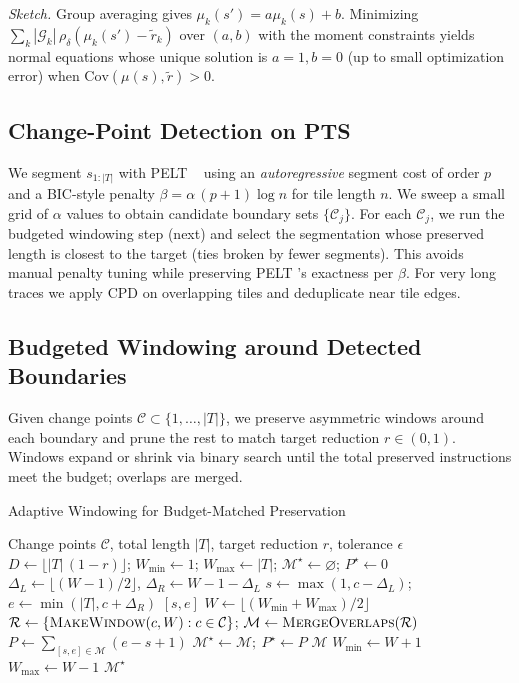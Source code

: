 \documentclass[conference]{IEEEtran}
\newcommand{\pts}{\textsc{PTS} }
\newcommand{\pelt}{\textsc{PELT} }
\begin{document}
\noindent\emph{Sketch.}
Group averaging gives \(\mu_k(s')=a\mu_k(s)+b\). Minimizing \(\sum_k|\mathcal{G}_k|\,\rho_\delta(\mu_k(s')-\tilde{r}_k)\) over \((a,b)\) with the moment constraints yields normal equations whose unique solution is \(a{=}1,b{=}0\) (up to small optimization error) when \(\mathrm{Cov}(\mu(s),\tilde{r})>0\).

\subsection{Change-Point Detection on \pts}
\label{subsec:cpd}
We segment \(s_{1:|T|}\) with \pelt~\cite{pelt12} using an \emph{autoregressive} segment cost of order \(p\) and a BIC-style penalty \(\beta=\alpha\,(p{+}1)\log n\) for tile length \(n\). We sweep a small grid of \(\alpha\) values to obtain candidate boundary sets \(\{\mathcal{C}_j\}\). For each \(\mathcal{C}_j\), we run the budgeted windowing step (next) and select the segmentation whose preserved length is closest to the target (ties broken by fewer segments). This avoids manual penalty tuning while preserving \pelt’s exactness per \(\beta\). For very long traces we apply CPD on overlapping tiles and deduplicate near tile edges.

\subsection{Budgeted Windowing around Detected Boundaries}
Given change points \(\mathcal{C}\subset\{1,\ldots,|T|\}\), we preserve asymmetric windows around each boundary and prune the rest to match target reduction \(r\in(0,1)\). Windows expand or shrink via binary search until the total preserved instructions meet the budget; overlaps are merged.

\begin{algorithm}[t]
\caption{Adaptive Windowing for Budget-Matched Preservation}
\label{alg:adaptive}
\small
\begin{algorithmic}[1]
\Require Change points \(\mathcal{C}\), total length \(|T|\), target reduction \(r\), tolerance \(\epsilon\)
\State \(D\gets \lfloor |T|\,(1-r)\rfloor\); \(W_{\min}\gets 1\); \(W_{\max}\gets |T|\); \(\mathcal{M}^\star\gets\varnothing\); \(P^\star\gets 0\)
  \State \(\Delta_L\gets\lfloor(W-1)/2\rfloor\), \(\Delta_R\gets W-1-\Delta_L\)
  \State \(s\gets\max(1,c-\Delta_L)\); \(e\gets\min(|T|,c+\Delta_R)\)
  \State \Return \([s,e]\)
\EndFunction
{}
  \State \(W\gets\lfloor(W_{\min}+W_{\max})/2\rfloor\)
  \State \(\mathcal{R}\gets \{\textsc{MakeWindow}(c,W):c\in\mathcal{C}\}\); \(\mathcal{M}\gets \textsc{MergeOverlaps}(\mathcal{R})\)
  \State \(P\gets\sum_{[s,e]\in\mathcal{M}}(e-s+1)\)
   \(\mathcal{M}^\star\gets\mathcal{M};\ P^\star\gets P\) \EndIf
   \Return \(\mathcal{M}\) \EndIf
   \State \(W_{\min}\gets W+1\) \Else \State \(W_{\max}\gets W-1\) \EndIf
\EndWhile
\State \Return \(\mathcal{M}^\star\) 
\end{algorithmic}
\end{algorithm}
\end{document}
